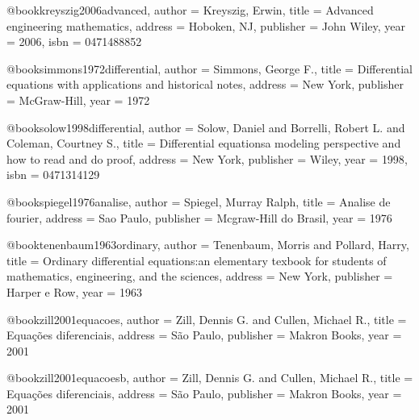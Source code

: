 @book{kreyszig2006advanced,
  author = {Kreyszig, Erwin},
  title = {Advanced engineering mathematics},
  address = {Hoboken, NJ},
  publisher = {John Wiley},
  year = {2006},
  isbn = {0471488852}
}

@book{simmons1972differential,
  author = {Simmons, George F.},
  title = {Differential equations with applications and historical notes},
  address = {New York},
  publisher = {McGraw-Hill},
  year = {1972}
}

@book{solow1998differential,
  author = {Solow, Daniel and Borrelli, Robert L. and Coleman, Courtney S.},
  title = {Differential equationsa modeling perspective and how to read and do proof},
  address = {New York},
  publisher = {Wiley},
  year = {1998},
  isbn = {0471314129}
}

@book{spiegel1976analise,
  author = {Spiegel, Murray Ralph},
  title = {Analise de fourier},
  address = {Sao Paulo},
  publisher = {Mcgraw-Hill do Brasil},
  year = {1976}
}

@book{tenenbaum1963ordinary,
  author = {Tenenbaum, Morris and Pollard, Harry},
  title = {Ordinary differential equations:an elementary texbook for students of mathematics, engineering, and the sciences},
  address = {New York},
  publisher = {Harper e Row},
  year = {1963}
}

@book{zill2001equacoes,
  author = {Zill, Dennis G. and Cullen, Michael R.},
  title = {Equações diferenciais},
  address = {São Paulo},
  publisher = {Makron Books},
  year = {2001}
}

@book{zill2001equacoesb,
  author = {Zill, Dennis G. and Cullen, Michael R.},
  title = {Equações diferenciais},
  address = {São Paulo},
  publisher = {Makron Books},
  year = {2001}
}

